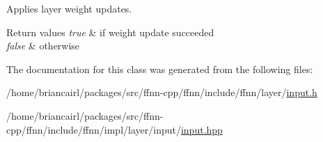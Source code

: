 Applies layer weight updates. 


\begin{DoxyRetVals}{Return values}
{\em true} & if weight update succeeded \\
\hline
{\em false} & otherwise \\
\hline
\end{DoxyRetVals}


The documentation for this class was generated from the following files\-:\begin{DoxyCompactItemize}
\item 
/home/briancairl/packages/src/ffnn-\/cpp/ffnn/include/ffnn/layer/\hyperlink{input_8h}{input.\-h}\item 
/home/briancairl/packages/src/ffnn-\/cpp/ffnn/include/ffnn/impl/layer/input/\hyperlink{input_8hpp}{input.\-hpp}\end{DoxyCompactItemize}

